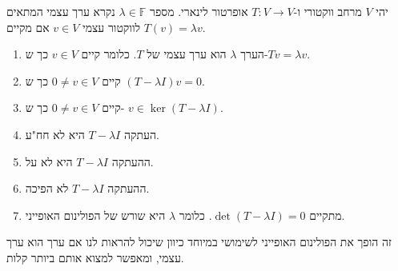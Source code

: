 \documentclass{tstextbook}
\begin{document}
\begin{definition}
יהי \(V\) מרחב ווקטורי ו-\(T:V\to V\) אופרטור לינארי. מספר \(\lambda \in \mathbb{F}\) נקרא ערך עצמי המתאים לווקטור עצמי \(v \in V\) אם מקיים \(T(v)=\lambda v\).

\end{definition}
\begin{proposition}
  \begin{enumerate}
    \item הערך \(\lambda\) הוא ערך עצמי של \(T\). כלומר קיים \(v \in V\) כך ש-\(Tv=\lambda v\). 


    \item קיים \(0\neq v\in V\) כך ש \(\left( T-\lambda I \right)v=0\). 


    \item קיים \(0\neq v \in V\) כך ש- \(v \in \ker\left( T-\lambda I \right)\).  


    \item העתקה \(T-\lambda I\) היא לא חח"ע. 


    \item ההעתקה \(T-\lambda I\) היא לא על. 


    \item ההעתקה \(T-\lambda I\) לא הפיכה. 


    \item מתקיים \(\det\left( T-\lambda I \right)=0\). כלומר \(\lambda\) היא שורש של הפולינום האופייני. 


  \end{enumerate}
\end{proposition}
זה הופך את הפולינום האופייני לשימושי במיוחד כיוון שיכול להראות לנו אם ערך הוא ערך עצמי, ומאפשר למצוא אותם ביותר קלות.
\end{document}
